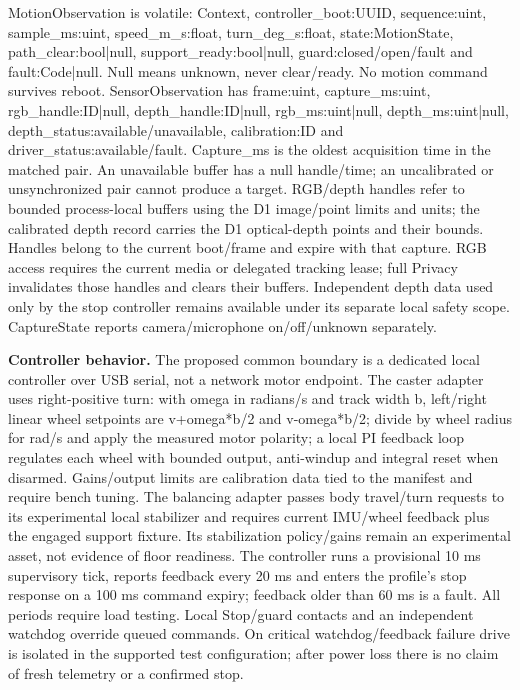 \documentclass[12pt,letterpaper]{article}
\begin{document}
MotionObservation is volatile: Context, controller\_\allowbreak{}boot:UUID, sequence:uint, sample\_\allowbreak{}ms:uint, speed\_\allowbreak{}m\_\allowbreak{}s:float, turn\_\allowbreak{}deg\_\allowbreak{}s:float, state:MotionState, path\_\allowbreak{}clear:bool|null, support\_\allowbreak{}ready:bool|null, guard:closed/\allowbreak{}open/\allowbreak{}fault and fault:Code|null. Null means unknown, never clear/ready. No motion command survives reboot. SensorObservation has frame:uint, capture\_\allowbreak{}ms:uint, rgb\_\allowbreak{}handle:ID|null, depth\_\allowbreak{}handle:ID|null, rgb\_\allowbreak{}ms:uint|null, depth\_\allowbreak{}ms:uint|null, depth\_\allowbreak{}status:available/unavailable, calibration:ID and driver\_\allowbreak{}status:available/fault. Capture\_\allowbreak{}ms is the oldest acquisition time in the matched pair. An unavailable buffer has a null handle/time; an uncalibrated or unsynchronized pair cannot produce a target. RGB/depth handles refer to bounded process-local buffers using the D1 image/point limits and units; the calibrated depth record carries the D1 optical-depth points and their bounds. Handles belong to the current boot/frame and expire with that capture. RGB access requires the current media or delegated tracking lease; full Privacy invalidates those handles and clears their buffers. Independent depth data used only by the stop controller remains available under its separate local safety scope. CaptureState reports camera/microphone on/off/unknown separately.

\textbf{Controller behavior.} The proposed common boundary is a dedicated local controller over USB serial, not a network motor endpoint. The caster adapter uses right-positive turn: with omega in radians/s and track width b, left/right linear wheel setpoints are v+omega*b/2 and v-omega*b/2; divide by wheel radius for rad/s and apply the measured motor polarity; a local PI feedback loop regulates each wheel with bounded output, anti-windup and integral reset when disarmed. Gains/output limits are calibration data tied to the manifest and require bench tuning. The balancing adapter passes body travel/turn requests to its experimental local stabilizer and requires current IMU/wheel feedback plus the engaged support fixture. Its stabilization policy/gains remain an experimental asset, not evidence of floor readiness. The controller runs a provisional 10 ms supervisory tick, reports feedback every 20 ms and enters the profile's stop response on a 100 ms command expiry; feedback older than 60 ms is a fault. All periods require load testing. Local Stop/guard contacts and an independent watchdog override queued commands. On critical watchdog/feedback failure drive is isolated in the supported test configuration; after power loss there is no claim of fresh telemetry or a confirmed stop.
\end{document}
